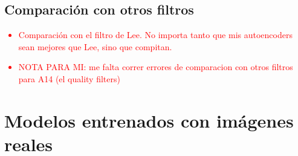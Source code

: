 \subsection{Comparación con otros filtros}

\textcolor{red}{
\begin{itemize}
    \item Comparación con el filtro de Lee. No importa tanto que mis autoencoders sean mejores que Lee, sino que compitan.
    \item NOTA PARA MI: me falta correr errores de comparacion con otros filtros para A14 (el quality filters)
\end{itemize}
}

\section{Modelos entrenados con imágenes reales}
